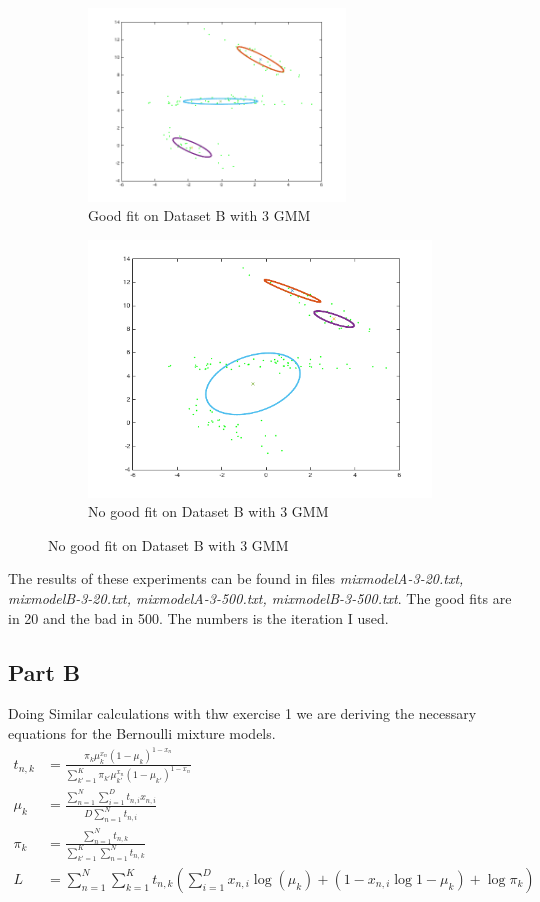 \begin{figure}[ht]
\begin{subfigure}[b]{0.5\linewidth}
    \centering
    \includegraphics[width=0.75\textwidth]{figures/mixmodelB_3_20.png}
    \caption{Good fit on Dataset B with 3 GMM}
    \vspace{4ex}
 \end{subfigure}%
  \begin{subfigure}[b]{0.5\linewidth}
  \centering
\includegraphics[width=0.75\linewidth]{figures/mixmodelB_3_500.png}
\caption{No good fit on Dataset B with 3 GMM}
\vspace{4ex}
\end{subfigure}%
\end{figure}
The results of these experiments can be found in files \textit{mixmodelA-3-20.txt, mixmodelB-3-20.txt, mixmodelA-3-500.txt,
mixmodelB-3-500.txt}. The good fits are in 20 and the bad in 500. The numbers is the iteration I used.
%
\subsection*{Part B}
Doing Similar calculations with thw exercise 1 we are deriving the necessary
equations for the Bernoulli mixture models.
\begin{align*}
t_{n,k} &= \frac{\pi_{k}\mu_{k}^{x_{n}} (1-\mu_{k})^{1-x_{n}}}{\sum_{k'=1}^K \pi_{k'} \mu_{k'}^{x_{n}}(1-\mu_{k'})^{1-x_n}}\\
\mu_{k} &= \frac{\sum_{n=1}^N\sum_{i=1}^{D} t_{n,i}x_{n,i}}{D\sum_{n=1}^N t_{n,i}}\\
\pi_{k} &= \frac{\sum_{n=1}^{N}t_{n,k}}{\sum_{k'=1}^K\sum_{n=1}^{N}t_{n,k}}\\
L &= \sum_{n=1}^{N}\sum_{k=1}^{K}t_{n,k}(\sum_{i=1}^{D}x_{n,i}\log(\mu_{k})+(1-x_{n,i}\log{1-\mu_{k}}) + \log\pi_{k})
\end{align*}
